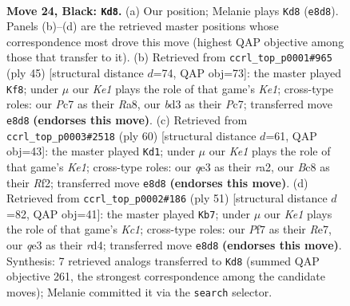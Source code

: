 \documentclass[11pt]{article}
\begin{document}
\clearpage

\begin{figure}[p]\centering
\begin{subfigure}{0.46\textwidth}\centering
\resizebox{\linewidth}{!}{%
\newchessgame
\chessboard[
  setfen={1rb1k1r1/p1p2p2/2pqp2p/6p1/2P5/3BQ3/P7/R2KR3 b - - 3 24},
  showmover=false,
  pgfstyle=straightmove, color=movearrow, markmove={e8-d8}
]}
\caption{}
\end{subfigure}\hfill
\begin{subfigure}{0.46\textwidth}\centering
\resizebox{\linewidth}{!}{%
\newchessgame
\chessboard[
  setfen={r3k3/p1p1qp1p/2p1p1r1/4Qp2/8/3R4/P1P2PPP/3R2K1 b q - 0 23},
  showmover=false,
  pgfstyle=straightmove, color=movearrow, markmove={e8-f8}
]}
\caption{}
\end{subfigure}
\\[4pt]
\begin{subfigure}{0.46\textwidth}\centering
\resizebox{\linewidth}{!}{%
\newchessgame
\chessboard[
  setfen={k3r3/1p4Bp/2p5/q7/3QpP2/1P4P1/r1PP1R1P/4K3 w - - 3 31},
  showmover=false,
  pgfstyle=straightmove, color=movearrow, markmove={e1-d1}
]}
\caption{}
\end{subfigure}\hfill
\begin{subfigure}{0.46\textwidth}\centering
\resizebox{\linewidth}{!}{%
\newchessgame
\chessboard[
  setfen={r1k5/p1pprp2/2q5/1p3Q2/3R4/8/P4PPP/3R2K1 b - - 2 26},
  showmover=false,
  pgfstyle=straightmove, color=movearrow, markmove={c8-b7}
]}
\caption{}
\end{subfigure}
\caption{\textbf{Move 24, Black: \texttt{Kd8}.} (a) Our position; Melanie plays \texttt{Kd8} (\texttt{e8d8}). Panels (b)--(d) are the retrieved master positions whose correspondence most drove this move (highest QAP objective among those that transfer to it). (b) Retrieved from \texttt{ccrl\_top\_p0001\#965} (ply 45) [structural distance $d$=74, QAP obj=73]: the master played \texttt{Kf8}; under $\mu$ our \emph{Ke1} plays the role of that game's \emph{Ke1}; cross-type roles: our \emph{P}c7 as their \emph{R}a8, our \emph{b}d3 as their \emph{P}c7; transferred move \texttt{e8d8} \textbf{(endorses this move)}. (c) Retrieved from \texttt{ccrl\_top\_p0003\#2518} (ply 60) [structural distance $d$=61, QAP obj=43]: the master played \texttt{Kd1}; under $\mu$ our \emph{Ke1} plays the role of that game's \emph{Ke1}; cross-type roles: our \emph{q}e3 as their \emph{r}a2, our \emph{B}c8 as their \emph{R}f2; transferred move \texttt{e8d8} \textbf{(endorses this move)}. (d) Retrieved from \texttt{ccrl\_top\_p0002\#186} (ply 51) [structural distance $d$=82, QAP obj=41]: the master played \texttt{Kb7}; under $\mu$ our \emph{Ke1} plays the role of that game's \emph{Kc1}; cross-type roles: our \emph{P}f7 as their \emph{R}e7, our \emph{q}e3 as their \emph{r}d4; transferred move \texttt{e8d8} \textbf{(endorses this move)}. Synthesis: 7 retrieved analogs transferred to \texttt{Kd8} (summed QAP objective 261, the strongest correspondence among the candidate moves); Melanie committed it via the \texttt{search} selector.}
\label{fig:thought-m47}
\end{figure}
\end{document}
